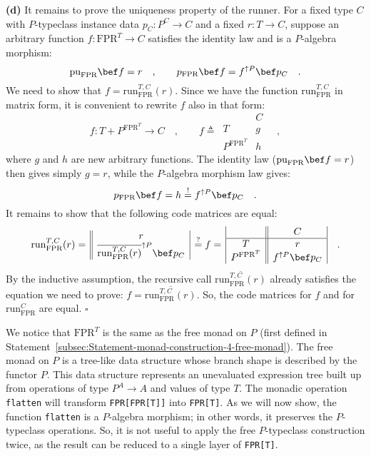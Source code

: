 \textbf{(d)} It remains to prove the uniqueness property of the runner.
For a fixed type $C$ with $P$-typeclass instance data $p_{C}:P^{C}\rightarrow C$
and a fixed $r:T\rightarrow C$, suppose an arbitrary function $f:\text{FPR}^{T}\rightarrow C$
satisfies the identity law and is a $P$-algebra morphism:
\[
\text{pu}_{\text{FPR}}\bef f=r\quad,\quad\quad p_{\text{FPR}}\bef f=f^{\uparrow P}\bef p_{C}\quad.
\]
We need to show that $f=\text{run}_{\text{FPR}}^{T,C}(r)$. Since
we have the function $\text{run}_{\text{FPR}}^{T,C}$ in matrix form,
it is convenient to rewrite $f$ also in that form:
\[
f:T+P^{\text{FPR}^{T}}\rightarrow C\quad,\quad\quad f\triangleq\,\begin{array}{|c||c|}
 & C\\
\hline T & g\\
P^{\text{FPR}^{T}} & h
\end{array}\quad,
\]
where $g$ and $h$ are new arbitrary functions. The identity law
($\text{pu}_{\text{FPR}}\bef f=r$) then gives simply $g=r$, while
the $P$-algebra morphism law gives:
\[
p_{\text{FPR}}\bef f=h\overset{!}{=}f^{\uparrow P}\bef p_{C}\quad.
\]
It remains to show that the following code matrices are equal:
\[
\text{run}_{\text{FPR}}^{T,C}(r)=\,\begin{array}{||c|}
r\\
\overline{\text{run}_{\text{FPR}}^{T,C}(r)}^{\uparrow P}\bef p_{C}
\end{array}\,\overset{?}{=}f=\,\begin{array}{|c||c|}
 & C\\
\hline T & r\\
P^{\text{FPR}^{T}} & f^{\uparrow P}\bef p_{C}
\end{array}\quad.
\]
By the inductive assumption, the recursive call $\overline{\text{run}_{\text{FPR}}^{T,C}(r)}$
already satisfies the equation we need to prove: $f=\overline{\text{run}_{\text{FPR}}^{T,C}(r)}$.
So, the code matrices for $f$ and for $\text{run}_{\text{FPR}}^{C}$
are equal. $\square$

We notice that $\text{FPR}^{T}$ is the same as the free monad
on $P$ (first defined in Statement~\ref{subsec:Statement-monad-construction-4-free-monad}).
The free monad on $P$ is a tree-like data structure whose branch
shape is described by the functor $P$. This data structure represents
an unevaluated expression tree built up from operations of type $P^{A}\rightarrow A$
and values of type $T$. The monadic operation \lstinline!flatten!
will transform \lstinline!FPR[FPR[T]]!
into \lstinline!FPR[T]!.
As we will now show, the function \lstinline!flatten!
is a $P$-algebra morphism; in other words, it preserves the $P$-typeclass
operations. So, it is not useful to apply the free $P$-typeclass
construction twice, as the result can be reduced to a single layer
of \lstinline!FPR[T]!.

